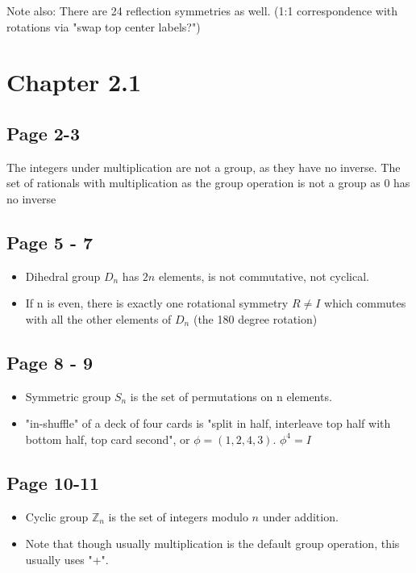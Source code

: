\documentclass[11pt, oneside]{article}   	%
\begin{document}
Note also: There are 24 reflection symmetries as well. (1:1 correspondence with rotations via "swap top center labels?")

\section {Chapter 2.1}

\subsection {Page 2-3}
The integers under multiplication are not a group, as they have no inverse.
The set of rationals with multiplication as the group operation is not a group as 0 has no inverse

\subsection {Page 5 - 7}

\begin{itemize}
\item Dihedral group $D_n$ has $2n$ elements, is not commutative, not cyclical.
\item If n is even, there is exactly one rotational symmetry $R\neq I$ which commutes with all the other elements of $D_n$ (the 180 degree rotation)
\end{itemize}

\subsection {Page 8 - 9}

\begin{itemize}
\item Symmetric group $S_n$ is the set of permutations on n elements.
\item "in-shuffle" of a deck of four cards is "split in half, interleave top half with bottom half, top card second", or $\phi = (1, 2, 4, 3)$.  $\phi^4 = I$
\end{itemize}

\subsection {Page 10-11}

\begin{itemize}
\item Cyclic group $\mathbb{Z}_n$ is the set of integers modulo $n$ under addition.  
\item Note that though usually multiplication is the default group operation, this usually uses "+".
\end{itemize}
\end{document}
